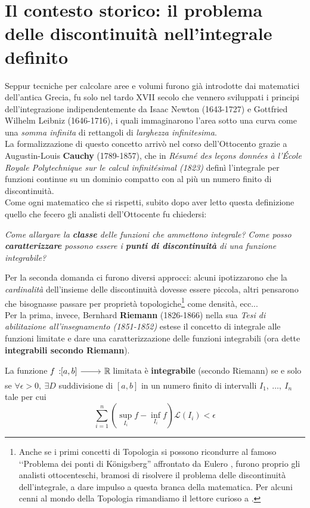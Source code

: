 \section{Il contesto storico: il problema delle discontinuità nell'integrale definito}
Seppur tecniche per calcolare aree e volumi furono già introdotte dai matematici dell'antica Grecia, fu solo nel tardo XVII secolo che vennero sviluppati i principi dell'integrazione indipendentemente da Isaac Newton (1643-1727) e Gottfried Wilhelm Leibniz (1646-1716), i quali immaginarono l'area sotto una curva come una \textit{somma infinita} di rettangoli di \textit{larghezza infinitesima}.\\
La formalizzazione di questo concetto arrivò nel corso dell'Ottocento grazie a Augustin-Louis \textbf{Cauchy} (1789-1857), che in \textit{Résumé des leçons données à l’École Royale Polytechnique sur le calcul infinitésimal (1823)} definì l'integrale per funzioni continue su un dominio compatto con al più un numero finito di discontinuità.\\
Come ogni matematico che si rispetti, subito dopo aver letto questa definizione quello che fecero gli analisti dell'Ottocente fu chiedersi:
\begin{center}
	\textit{Come allargare la \textbf{classe} delle funzioni che ammettono integrale?}
	\textit{Come posso \textbf{caratterizzare} possono essere i \textbf{punti di discontinuità} di una funzione
		integrabile?}\\
\end{center}
Per la seconda domanda ci furono diversi approcci: alcuni ipotizzarono che la \textit{cardinalità} dell'insieme delle discontinuità dovesse essere piccola, altri pensarono che bisognasse passare per proprietà topologiche\footnote{Anche se i primi concetti di Topologia si possono ricondurre al famoso ‘‘Problema dei ponti di Königsberg'' affrontato da Eulero , furono proprio gli analisti ottocenteschi, bramosi di risolvere il problema delle discontinuità dell'integrale, a dare impulso a questa branca della matematica. Per alcuni cenni al mondo della Topologia rimandiamo il lettore curioso a \cite{antucabertolotti:2021manualozzogeometria}.} come densità, ecc...\\
Per la prima, invece, Bernhard \textbf{Riemann} (1826-1866) nella sua \textit{Tesi di abilitazione all'insegnamento (1851-1852)} estese il concetto di integrale alle funzioni limitate e dare una caratterizzazione delle funzioni integrabili (ora dette \textbf{integrabili secondo Riemann}).
\begin{define}
La funzione $\funz{f}{\left[a,b\right]}{\realset}$ limitata è \textbf{integrabile} (secondo Riemann) se e solo se $\forall \epsilon>0,\ \exists D$ suddivisione di $\left[a,b\right]$ in un numero finito di intervalli $I_1,\ \ldots,\ I_n$ tale per cui
\begin{equation}
	\sum_{i=1}^{n}\left(\sup_{I_i}f-\inf_{I_i}f\right)\mathcal{L}\left(I_i\right)<\epsilon
\end{equation}
\end{define}
